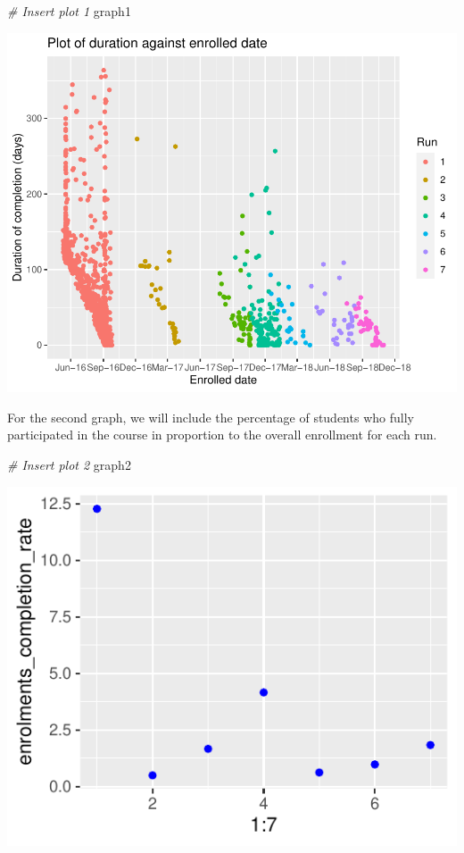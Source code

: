 \documentclass[12pt,]{article}
\newenvironment{Shaded}{\begin{snugshade}}{\end{snugshade}}
\newcommand{\CommentTok}[1]{\textcolor[rgb]{0.56,0.35,0.01}{\textit{#1}}}
\newcommand{\NormalTok}[1]{#1}
\begin{document}
\begin{Shaded}
\begin{Highlighting}[]
\CommentTok{\# Insert plot 1}
\NormalTok{graph1}
\end{Highlighting}
\end{Shaded}

\begin{center}\includegraphics{report_files/figure-latex/unnamed-chunk-3-1} \end{center}

For the second graph, we will include the percentage of students who
fully participated in the course in proportion to the overall enrollment
for each run.

\begin{Shaded}
\begin{Highlighting}[]
\CommentTok{\# Insert plot 2}
\NormalTok{graph2}
\end{Highlighting}
\end{Shaded}

\begin{center}\includegraphics{report_files/figure-latex/unnamed-chunk-4-1} \end{center}
\end{document}
